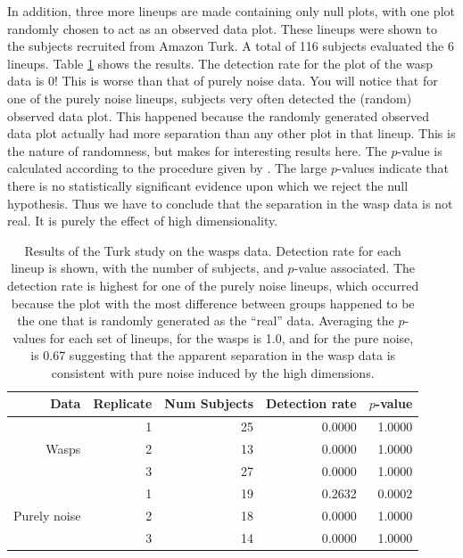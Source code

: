In addition, three more lineups are made containing only null plots, with one plot randomly chosen to act as an observed data plot. These lineups were shown to the subjects recruited from Amazon Turk.  A total of 116 subjects evaluated the 6 lineups. Table \ref{wasp} shows the results. The detection rate for the plot of the wasp data is 0! This is worse than that of purely noise data. You will notice that for one of the purely noise lineups, subjects very often detected the (random) observed data plot. This happened because the randomly generated observed data plot actually had more separation than any other plot in that lineup. This is the nature of randomness, but makes for interesting results here. The $p$-value is calculated according to the procedure given by \cite{majumder:2013}. The large $p$-values indicate that there is no statistically significant evidence upon which we reject the null hypothesis. Thus we have to conclude that the separation in the wasp data is not real. It is purely the effect of high dimensionality. 

\begin{table}[ht]
\begin{center}
\caption{Results of the Turk study on the wasps data. Detection rate for each lineup is shown, with the number of subjects, and $p$-value associated. The detection rate is highest for one of the purely noise lineups, which occurred because the plot with the most difference between groups happened to be the one that is randomly generated as the ``real'' data. Averaging the $p$-values for each set of lineups, for the wasps is 1.0, and for the pure noise, is 0.67 suggesting that the apparent separation in the wasp data is consistent with pure noise induced by the high dimensions.}
\vspace{0.15cm}
\begin{tabular}{r|r|r|rr}
\hline
  \hline
 Data & Replicate & Num Subjects & Detection rate & $p$-value\\ 
  \hline
  & 1 & 25 & 0.0000 &  1.0000\\
Wasps & 2 & 13 & 0.0000 &  1.0000\\ 
 & 3 & 27 & 0.0000 &  1.0000\\
 \hline
 & 1 & 19 & 0.2632 &  0.0002\\
Purely noise & 2 & 18 & 0.0000 &  1.0000 \\ 
 & 3 & 14 & 0.0000 &  1.0000\\
   \hline
\end{tabular}
\label{wasp}
\end{center}
\end{table}

